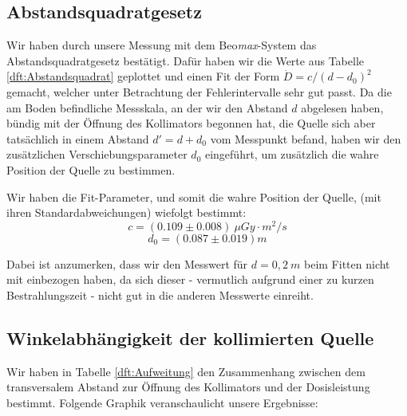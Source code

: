 \subsection{Abstandsquadratgesetz}
Wir haben durch unsere Messung mit dem Beo\textit{max}-System das Abstandsquadratgesetz bestätigt. Dafür haben wir die Werte aus Tabelle \ref{dft:Abstandsquadrat} geplottet und einen Fit der Form $\dot{D} = c/(d-d_0)^2$ gemacht, welcher unter Betrachtung der Fehlerintervalle sehr gut passt. Da die am Boden befindliche Messskala, an der wir den Abstand $d$ abgelesen haben, bündig mit der Öffnung des Kollimators begonnen hat, die Quelle sich aber tatsächlich in einem Abstand $d' = d + d_0$ vom Messpunkt befand, haben wir den zusätzlichen Verschiebungsparameter $d_0$ eingeführt, um zusätzlich die wahre Position der Quelle zu bestimmen.

	\minipanf    
        \label{fig:Abstandsquadrat}
    \minipend
    \vspace{5mm}

Wir haben die Fit-Parameter, und somit die wahre Position der Quelle, (mit ihren Standardabweichungen) wiefolgt bestimmt:
\begin{equation*}
		c = (0.109 \pm 0.008)\ \mu Gy \cdot m^2/s
\end{equation*}
\begin{equation*}
		d_0 = (0.087 \pm 0.019) m
\end{equation*}

Dabei ist anzumerken, dass wir den Messwert für $d=0,2\ m$ beim Fitten nicht mit einbezogen haben, da sich dieser - vermutlich aufgrund einer zu kurzen Bestrahlungszeit - nicht gut in die anderen Messwerte einreiht.

\subsection{Winkelabhängigkeit der kollimierten Quelle}
Wir haben in Tabelle \ref{dft:Aufweitung} den Zusammenhang zwischen dem transversalem Abstand zur Öffnung des Kollimators und der Dosisleistung bestimmt. Folgende Graphik veranschaulicht unsere Ergebnisse:

